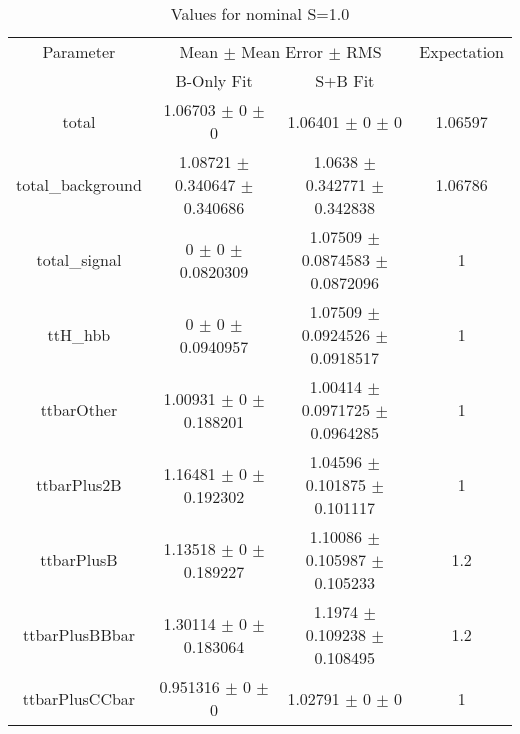 \begin{table}
\centering
\caption{Values for nominal S=1.0}
\begin{tabular}{cccc}
\toprule
Parameter & \multicolumn{2}{c}{Mean $\pm$ Mean Error $\pm$ RMS} & Expectation\\
 & B-Only Fit & S+B Fit & \\
\midrule
total & \num{1.06703} $\pm$ \num{0} $\pm$ \num{0} & \num{1.06401} $\pm$ \num{0} $\pm$ \num{0} & \num{1.06597}\\
total\_background & \num{1.08721} $\pm$ \num{0.340647} $\pm$ \num{0.340686} & \num{1.0638} $\pm$ \num{0.342771} $\pm$ \num{0.342838} & \num{1.06786}\\
total\_signal & \num{0} $\pm$ \num{0} $\pm$ \num{0.0820309} & \num{1.07509} $\pm$ \num{0.0874583} $\pm$ \num{0.0872096} & \num{1}\\
ttH\_hbb & \num{0} $\pm$ \num{0} $\pm$ \num{0.0940957} & \num{1.07509} $\pm$ \num{0.0924526} $\pm$ \num{0.0918517} & \num{1}\\
ttbarOther & \num{1.00931} $\pm$ \num{0} $\pm$ \num{0.188201} & \num{1.00414} $\pm$ \num{0.0971725} $\pm$ \num{0.0964285} & \num{1}\\
ttbarPlus2B & \num{1.16481} $\pm$ \num{0} $\pm$ \num{0.192302} & \num{1.04596} $\pm$ \num{0.101875} $\pm$ \num{0.101117} & \num{1}\\
ttbarPlusB & \num{1.13518} $\pm$ \num{0} $\pm$ \num{0.189227} & \num{1.10086} $\pm$ \num{0.105987} $\pm$ \num{0.105233} & \num{1.2}\\
ttbarPlusBBbar & \num{1.30114} $\pm$ \num{0} $\pm$ \num{0.183064} & \num{1.1974} $\pm$ \num{0.109238} $\pm$ \num{0.108495} & \num{1.2}\\
ttbarPlusCCbar & \num{0.951316} $\pm$ \num{0} $\pm$ \num{0} & \num{1.02791} $\pm$ \num{0} $\pm$ \num{0} & \num{1}\\
\bottomrule
\end{tabular}
\end{table}